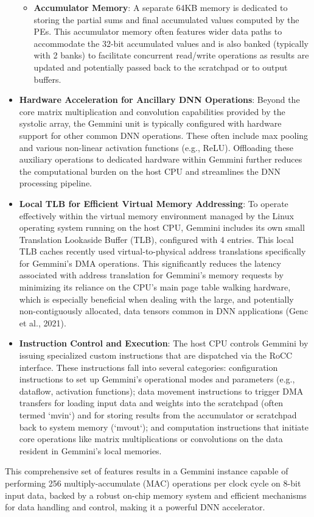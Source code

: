 \begin{itemize}
\begin{itemize}
            \item \textbf{Accumulator Memory}: A separate 64KB memory is dedicated to storing the partial sums and final accumulated values computed by the PEs. This accumulator memory often features wider data paths to accommodate the 32-bit accumulated values and is also banked (typically with 2 banks) to facilitate concurrent read/write operations as results are updated and potentially passed back to the scratchpad or to output buffers.
        \end{itemize}
    \item \textbf{Hardware Acceleration for Ancillary DNN Operations}: Beyond the core matrix multiplication and convolution capabilities provided by the systolic array, the Gemmini unit is typically configured with hardware support for other common DNN operations. These often include max pooling and various non-linear activation functions (e.g., ReLU). Offloading these auxiliary operations to dedicated hardware within Gemmini further reduces the computational burden on the host CPU and streamlines the DNN processing pipeline.
    \item \textbf{Local TLB for Efficient Virtual Memory Addressing}: To operate effectively within the virtual memory environment managed by the Linux operating system running on the host CPU, Gemmini includes its own small Translation Lookaside Buffer (TLB), configured with 4 entries. This local TLB caches recently used virtual-to-physical address translations specifically for Gemmini's DMA operations. This significantly reduces the latency associated with address translation for Gemmini's memory requests by minimizing its reliance on the CPU's main page table walking hardware, which is especially beneficial when dealing with the large, and potentially non-contiguously allocated, data tensors common in DNN applications (Genc et al., 2021).
    \item \textbf{Instruction Control and Execution}: The host CPU controls Gemmini by issuing specialized custom instructions that are dispatched via the RoCC interface. These instructions fall into several categories: configuration instructions to set up Gemmini's operational modes and parameters (e.g., dataflow, activation functions); data movement instructions to trigger DMA transfers for loading input data and weights into the scratchpad (often termed `mvin`) and for storing results from the accumulator or scratchpad back to system memory (`mvout`); and computation instructions that initiate core operations like matrix multiplications or convolutions on the data resident in Gemmini's local memories.
\end{itemize}
This comprehensive set of features results in a Gemmini instance capable of performing 256 multiply-accumulate (MAC) operations per clock cycle on 8-bit input data, backed by a robust on-chip memory system and efficient mechanisms for data handling and control, making it a powerful DNN accelerator.

